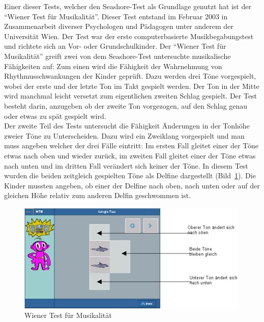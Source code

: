 \documentclass{acm_proc_article-sp}
\begin{document}
Einer dieser Tests, welcher den Seashore-Test als Grundlage genutzt hat ist der "`Wiener Test für Musikalität"'\cite{laengle:2003}. Dieser Test entstand im Februar 2003 in Zusammenarbeit diverser Psychologen und Pädagogen unter anderem der Universität Wien. Der Test war der erste computerbasierte Musikbegabungstest und richtete sich an Vor- oder Grundschulkinder. Der "`Wiener Test für Musikalität"' greift zwei von dem Seashore-Test untersuchte musikalische Fähigkeiten auf: Zum einen wird die Fähigkeit der Wahrnehmung von Rhythmusschwankungen der Kinder geprüft. Dazu werden drei Töne vorgespielt, wobei der erste und der letzte Ton im Takt gespielt werden. Der Ton in der Mitte wird manchmal leicht versetzt zum eigentlichen zweiten Schlag gespielt. Der Test besteht darin, anzugeben ob der zweite Ton vorgezogen, auf den Schlag genau oder etwas zu spät gespielt wird.\\
Der zweite Teil des Tests untersucht die Fähigkeit Änderungen in der Tonhöhe zweier Töne zu Unterscheiden. Dazu wird ein Zweiklang vorgespielt und man muss angeben welcher der drei Fälle eintritt: Im ersten Fall gleitet einer der Töne etwas nach oben und wieder zurück, im zweiten Fall gleitet einer der Töne etwas nach unten und im dritten Fall verändert sich keiner der Töne. In diesem Test wurden die beiden zeitgleich gespielten Töne als Delfine dargestellt (Bild~\ref{pic:wienertest}). Die Kinder mussten angeben, ob einer der Delfine nach oben, nach unten oder auf der gleichen Höhe relativ zum anderen Delfin geschwommen ist. 
\begin{figure}[H]
\centering
\includegraphics[width=1.0\linewidth]{Abbildungen/wienertest.jpg}
\caption{Wiener Test für Musikalität}
\label{pic:wienertest}
\end{figure}
\end{document}
